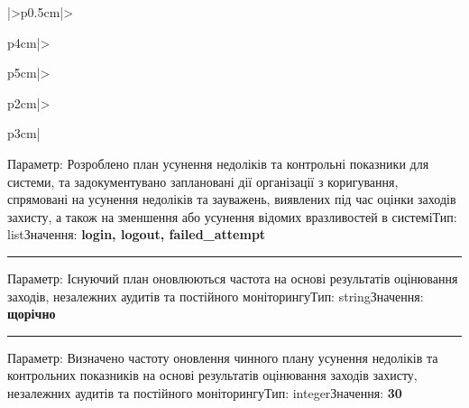 \documentclass[10pt]{article}
\begin{document}
\begin{longtable}{|>{\centering\arraybackslash}p{0.5cm}|>{\raggedright\arraybackslash}p{4cm}|>{\raggedright\arraybackslash}p{5cm}|>{\raggedright\arraybackslash}p{2cm}|>{\raggedright\arraybackslash}p{3cm}|}
Параметр: Розроблено план усунення недоліків та контрольні показники для системи, та задокументувано заплановані дії організації з коригування, спрямовані на усунення недоліків та зауважень, виявлених під час оцінки заходів захисту, а також на зменшення або усунення відомих вразливостей в системі\newline Тип: list\newline Значення: \textbf{login, logout, failed\_\allowbreak{}attempt}\vspace{1mm}\newline\noindent\rule{\linewidth}{0.4pt}\vspace{1mm}
Параметр: Існуючий план оновлюються частота на основі результатів оцінювання заходів, незалежних аудитів та постійного моніторингу\newline Тип: string\newline Значення: \textbf{щорічно}\vspace{1mm}\newline\noindent\rule{\linewidth}{0.4pt}\vspace{1mm}
Параметр: Визначено частоту оновлення чинного плану усунення недоліків та контрольних показників на основі результатів оцінювання заходів захисту, незалежних аудитів та постійного моніторингу\newline Тип: integer\newline Значення: \textbf{30} \\ \hline

\end{longtable}
\end{document}
